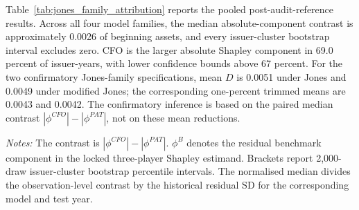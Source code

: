 Table~\ref{tab:jones_family_attribution} reports the pooled post-audit-reference results. Across all four model families, the median absolute-component contrast is approximately 0.0026 of beginning assets, and every issuer-cluster bootstrap interval excludes zero. CFO is the larger absolute Shapley component in 69.0 percent of issuer-years, with lower confidence bounds above 67 percent. For the two confirmatory Jones-family specifications, mean $D$ is 0.0051 under Jones and 0.0049 under modified Jones; the corresponding one-percent trimmed means are 0.0043 and 0.0042. The confirmatory inference is based on the paired median contrast $|\phi^{CFO}|-|\phi^{PAT}|$, not on these mean reductions.

\begin{table}[htbp]
\centering
\caption{Primary three-player component attribution for RQ1}
\label{tab:jones_family_attribution}
\scriptsize
{}
\begin{minipage}{0.97\textwidth}\footnotesize
\textit{Notes:} The contrast is $|\phi^{CFO}|-|\phi^{PAT}|$. $\phi^{B}$ denotes the residual benchmark component in the locked three-player Shapley estimand. Brackets report 2,000-draw issuer-cluster bootstrap percentile intervals. The normalised median divides the observation-level contrast by the historical residual SD for the corresponding model and test year.
\end{minipage}
\end{table}


